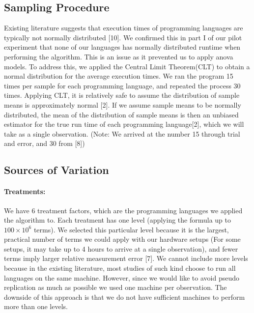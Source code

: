\documentclass[12pt,halfline,a4paper,]{ouparticle}
\begin{document}
\subsection{Sampling Procedure}\label{sampling-procedure}

Existing literature suggests that execution times of programming
languages are typically not normally distributed {[}10{]}. We confirmed
this in part I of our pilot experiment that none of our languages has
normally distributed runtime when performing the algorithm. This is an
issue as it prevented us to apply anova models. To address this, we
applied the Central Limit Theorem(CLT) to obtain a normal distribution
for the average execution times. We ran the program 15 times per sample
for each programming language, and repeated the process 30 times.
Applying CLT, it is relatively safe to assume the distribution of sample
means is approximately normal {[}2{]}. If we assume sample means to be
normally distributed, the mean of the distribution of sample means is
then an unbiased estimator for the true run time of each programming
language{[}2{]}, which we will take as a single observation. (Note: We
arrived at the number 15 through trial and error, and 30 from {[}8{]})

\subsection{Sources of Variation}\label{sources-of-variation}

\paragraph{Treatments:}\label{treatments}

We have 6 treatment factors, which are the programming languages we
applied the algorithm to. Each treatment has one level (applying the
formula up to \(100 \times 10^6\) terms). We selected this particular
level because it is the largest, practical number of terms we could
apply with our hardware setups (For some setups, it may take up to 4
hours to arrive at a single observation), and fewer terms imply larger
relative measurement error {[}7{]}. We cannot include more levels
because in the existing literature, most studies of such kind choose to
run all languages on the same machine. However, since we would like to
avoid pseudo replication as much as possible we used one machine per
observation. The downside of this approach is that we do not have
sufficient machines to perform more than one levels.
\end{document}
